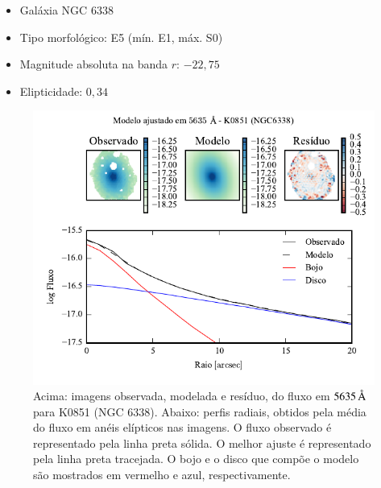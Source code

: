 \begin{itemize}
  \item Galáxia NGC 6338
  \item Tipo morfológico: E5 (mín. E1, máx. S0)
  \item Magnitude absoluta na banda $r$: $-22,75$
  \item Elipticidade: $0,34$
\end{itemize}

\begin{figure}
	\includegraphics[page=1]{figuras-decomp/K0851_sample006a}
	\caption[Ajuste morfológico em $5635\,\angstrom$ de K0851 (NGC 6338)]
	{Acima: imagens observada, modelada e resíduo, do fluxo em $5635\,\angstrom$
	para K0851 (NGC 6338). Abaixo: perfis radiais, obtidos pela média do fluxo em
	anéis elípticos nas imagens. O fluxo observado é representado pela linha preta
	sólida. O melhor ajuste é representado pela linha preta tracejada. O bojo e o
	disco que compõe o modelo são mostrados em vermelho e azul, respectivamente.}
	\label{fig:decompRadprof:K0851}
\end{figure}

